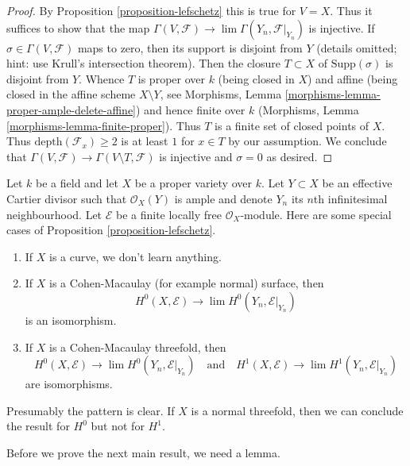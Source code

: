 \begin{proof}
By Proposition \ref{proposition-lefschetz} this is true for $V = X$.
Thus it suffices to show that the map
$\Gamma(V, \mathcal{F}) \to \lim \Gamma(Y_n, \mathcal{F}|_{Y_n})$
is injective. If $\sigma \in \Gamma(V, \mathcal{F})$
maps to zero, then its support is disjoint from $Y$ (details omitted; hint:
use Krull's intersection theorem). Then the closure $T \subset X$
of $\text{Supp}(\sigma)$ is disjoint from $Y$.
Whence $T$ is proper over $k$ (being closed in $X$)
and affine (being closed in the affine scheme $X \setminus Y$, see
Morphisms, Lemma \ref{morphisms-lemma-proper-ample-delete-affine})
and hence finite over $k$
(Morphisms, Lemma \ref{morphisms-lemma-finite-proper}).
Thus $T$ is a finite set of closed points of $X$.
Thus $\text{depth}(\mathcal{F}_x) \geq 2$ is at least $1$
for $x \in T$ by our assumption. We conclude that
$\Gamma(V, \mathcal{F}) \to \Gamma(V \setminus T, \mathcal{F})$
is injective and $\sigma = 0$ as desired.
\end{proof}


\begin{example}
\label{example-lefschetz}
Let $k$ be a field and let $X$ be a proper variety over $k$.
Let $Y \subset X$ be an effective Cartier divisor such that
$\mathcal{O}_X(Y)$ is ample and
denote $Y_n$ its $n$th infinitesimal neighbourhood.
Let $\mathcal{E}$ be a finite locally free $\mathcal{O}_X$-module.
Here are some special cases of Proposition \ref{proposition-lefschetz}.
\begin{enumerate}
\item If $X$ is a curve, we don't learn anything.
\item If $X$ is a Cohen-Macaulay (for example normal) surface, then
$$
H^0(X, \mathcal{E}) \to \lim H^0(Y_n, \mathcal{E}|_{Y_n})
$$
is an isomorphism.
\item If $X$ is a Cohen-Macaulay threefold, then
$$
H^0(X, \mathcal{E}) \to \lim H^0(Y_n, \mathcal{E}|_{Y_n})
\quad\text{and}\quad
H^1(X, \mathcal{E}) \to \lim H^1(Y_n, \mathcal{E}|_{Y_n})
$$
are isomorphisms.
\end{enumerate}
Presumably the pattern is clear. If $X$ is a normal threefold, then
we can conclude the result for $H^0$ but not for $H^1$.
\end{example}

\noindent
Before we prove the next main result, we need a lemma.

